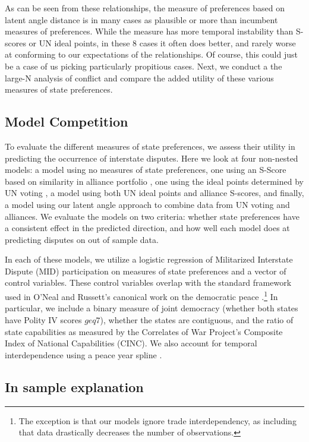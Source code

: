 As can be seen from these relationships, the measure of preferences based on latent angle distance is in many cases as plausible or more than incumbent measures of preferences. While the measure has more temporal instability than S-scores or UN ideal points, in these 8 cases it often does better, and rarely worse at conforming to our expectations of the relationships. Of course, this could just be a case of us picking particularly propitious cases. Next, we conduct a the large-N analysis of conflict and compare the added utility of these various measures of state preferences.

\subsection*{Model Competition}

To evaluate the different measures of state preferences, we assess their utility in predicting the occurrence of interstate disputes. Here we look at four non-nested models: a model using no measures of state preferences, one using an S-Score based on similarity in alliance portfolio \citep{signorino:ritter:1999}, one using the ideal points determined by UN voting \citep{bailey:etal:2015}, a model using both UN ideal points and alliance S-scores, and finally, a model using our latent angle approach to combine data from UN voting and alliances. We evaluate the models on two criteria: whether state preferences have a consistent effect in the predicted direction, and how well each model does at predicting disputes on out of sample data.

In each of these models, we utilize a logistic regression of Militarized Interstate Dispute (MID) participation on measures of state preferences and a vector of control variables. These control variables overlap with the standard framework used in O'Neal and Russett's canonical work on the democratic peace \citep{oneal:russett:1997}.\footnote{The exception is that our models ignore trade interdependency, as including that data drastically decreases the number of observations.} In particular, we include a binary measure of joint democracy (whether both states have Polity IV scores $geq 7$), whether the states are contiguous, and the ratio of state capabilities as measured by the Correlates of War Project's Composite Index of National Capabilities (CINC). We also account for temporal interdependence using a peace year spline \citep{carter:signorino:2010}. 

\subsection*{In sample explanation}

